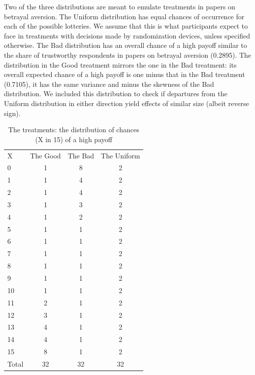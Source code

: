 Two of the three distributions are meant to emulate treatments in papers on betrayal aversion.
The Uniform distribution has equal chances of occurrence for each of the possible lotteries.
We assume that this is what participants expect to face in treatments with decisions made by randomization devices, unless specified otherwise.
The Bad distribution has an overall chance of a high payoff similar to the share of trustworthy respondents in papers on betrayal aversion (0.2895).
The distribution in the Good treatment mirrors the one in the Bad treatment: its overall expected chance of a high payoff is one minus that in the Bad treatment (0.7105), it has the same variance and minus the skewness of the Bad distribution.
We included this distribution to check if departures from the Uniform distribution in either direction yield effects of similar size (albeit reverse sign).


\begin{table}[htbp]
\centering \caption{The treatments: the distribution of chances (X in 15) of a high payoff}\label{tab:distr}
\begin{threeparttable}
\begin{tabular}
   {@{}
	l
	*3c
	@{}
	}
\toprule
X 	&	{The Good}&{The Bad}&	{The Uniform}\\
\cmidrule{2-4}
0	&	1&       8&	2\\
1	&	1&       4&	2\\
2	&	1&       4&	2\\
3	&	1&       3&	2\\
4	&	1&       2&	2\\
5	&	1&       1&	2\\
6	&	1&       1&	2\\
7	&	1&       1&	2\\
8	&	1&       1&	2\\
9	&	1&       1&	2\\
10	&	1&       1&	2\\
11	&	2&       1&	2\\
12	&	3&       1&	2\\
13	&	4&       1&	2\\
14	&	4&       1&	2\\
15	&	8&       1&	2\\
\midrule
Total	&	32&       32&	32\\
\bottomrule

\end{tabular}
\end{threeparttable}
\end{table}

